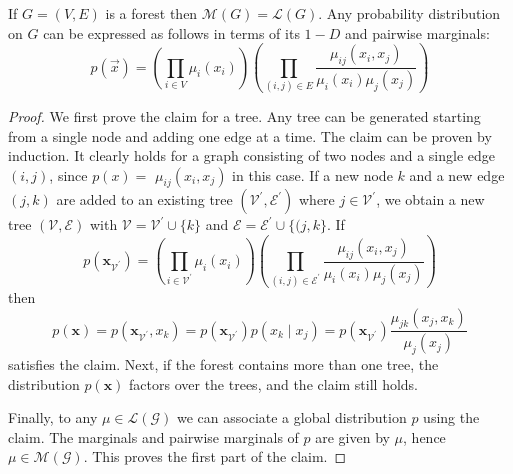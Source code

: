 \documentclass[11pt]{elegantbook}
\begin{document}
\begin{proposition}[ For foster $\mathcal{M}(G)=\mathcal{L}(G)$]
    If $G=(V,E)$ is a forest then $\mathcal{M}(G)=\mathcal{L}(G)$. Any probability distribution on $G$ can be expressed as follows in terms of its $1-D$ and pairwise marginals:
    $$
    p(\vec{x})=\left(\prod_{i \in V} \mu_i\left(x_i\right)\right)\left(\prod_{(i, j) \in E} \frac{\mu_{i j}\left(x_i, x_j\right)}{\mu_i\left(x_i\right) \mu_j\left(x_j\right)}\right)
    $$
\end{proposition}
\begin{proof}
    We first prove the claim for a tree. Any tree can be generated starting from a single node and adding one edge at a time. The claim can be proven by induction. It clearly holds for a graph consisting of two nodes and a single edge $(i, j)$, since $p(x)=$ $\mu_{i j}\left(x_i, x_j\right)$ in this case. If a new node $k$ and a new edge $(j, k)$ are added to an existing tree $\left(\mathcal{V}^{\prime}, \mathcal{E}^{\prime}\right)$ where $j \in \mathcal{V}^{\prime}$, we obtain a new tree $(\mathcal{V}, \mathcal{E})$ with $\mathcal{V}=\mathcal{V}^{\prime} \cup\{k\}$ and $\mathcal{E}=\mathcal{E}^{\prime} \cup\{(j, k\}$. If
    $$
    p\left(\boldsymbol{x}_{\mathcal{V}^{\prime}}\right)=\left(\prod_{i \in \mathcal{V}^{\prime}} \mu_i\left(x_i\right)\right)\left(\prod_{(i, j) \in \mathcal{E}^{\prime}} \frac{\mu_{i j}\left(x_i, x_j\right)}{\mu_i\left(x_i\right) \mu_j\left(x_j\right)}\right)
    $$
    then
    $$
    p(\boldsymbol{x})=p\left(\boldsymbol{x}_{\mathcal{V}^{\prime}}, x_k\right)=p\left(\boldsymbol{x}_{\mathcal{V}^{\prime}}\right) p\left(x_k \mid x_j\right)=p\left(\boldsymbol{x}_{\mathcal{V}^{\prime}}\right) \frac{\mu_{j k}\left(x_j, x_k\right)}{\mu_j\left(x_j\right)}
    $$
    satisfies the claim. Next, if the forest contains more than one tree, the distribution $p(\boldsymbol{x})$ factors over the trees, and the claim still holds.
    
    Finally, to any $\mu \in \mathcal{L}(\mathcal{G})$ we can associate a global distribution $p$ using the claim. The marginals and pairwise marginals of $p$ are given by $\mu$, hence $\mu \in \mathcal{M}(\mathcal{G})$. This proves the first part of the claim.
\end{proof}
\end{document}
